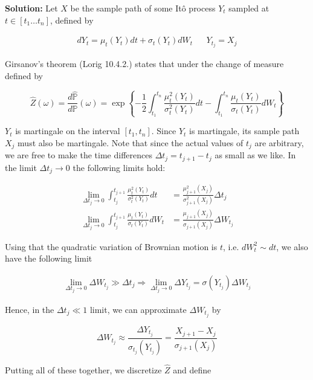 \documentclass[12pt, a4paper]{article}
\begin{document}
\begin{enumerate}
\begin{enumerate}
        \textbf{Solution:} Let $X$ be the sample path of some Itô process $Y_t$ sampled at $t \in [t_1\dots t_n]$, defined by

        \begin{align*}
            dY_t = \mu_t(Y_t)dt + \sigma_t(Y_t)dW_t && Y_{t_j} = X_j
        \end{align*}

        Girsanov's theorem (Lorig 10.4.2.) states that under the change of measure defined by 

        $$\hat Z(\omega) = \frac{d \hat{\mathbb P}}{d \mathbb P}(\omega) = \exp \left\{-\frac{1}{2}\int_{t_1}^{t_n}  \frac{\mu_t^2(Y_t)}{\sigma_t^2(Y_t)}dt - \int_{t_1}^{t_n} \frac{\mu_t(Y_t)}{\sigma_t(Y_t)}dW_t \right\}$$

        $Y_t$ is martingale on the interval $[t_1, t_n]$. Since $Y_t$ is martingale, its sample path $X_j$ must also be martingale. Note that since the actual values of $t_j$ are arbitrary, we are free to make the time differences $\Delta t_j = t_{j+1}-t_j$ as small as we like. In the limit $\Delta t_j \rightarrow 0$ the following limits hold:

        \begin{align*}
            \lim_{\Delta t_j \rightarrow 0} \int_{t_j}^{t_{j+1}} \frac{\mu_t^2(Y_t)}{\sigma_t^2(Y_t)}dt &= \frac{\mu_{j+1}^2(X_j)}{\sigma_{j+1}^2(X_j)} \Delta t_j \\
            \lim_{\Delta t_j \rightarrow 0} \int_{t_j}^{t_{j+1}} \frac{\mu_t(Y_t)}{\sigma_t(Y_t)}dW_t &= \frac{\mu_{j+1}(X_j)}{\sigma_{j+1}(X_j)} \Delta W_{t_j}
        \end{align*}

        Using that the quadratic variation of Brownian motion is $t$, i.e. $dW_t^2 \sim dt$, we also have the following limit

        \begin{align*}
            \lim_{\Delta t_j \rightarrow 0} \Delta W_{t_j} \gg \Delta t_j \Rightarrow \lim_{\Delta t_j \rightarrow 0} \Delta Y_{t_j} = \sigma(Y_{t_j})\Delta W_{t_j}
        \end{align*}

        Hence, in the $\Delta t_j \ll 1$ limit, we can approximate $\Delta W_{t_j}$ by 
        
        $$\Delta W_{t_j} \approx \frac{\Delta Y_{t_j}}{\sigma_{t_j}(Y_{t_j})} = \frac{X_{j+1}-X_j}{\sigma_{j+1}(X_j)}$$

        Putting all of these together, we discretize $\hat Z$ and define


\end{enumerate}
\end{enumerate}
\end{document}
